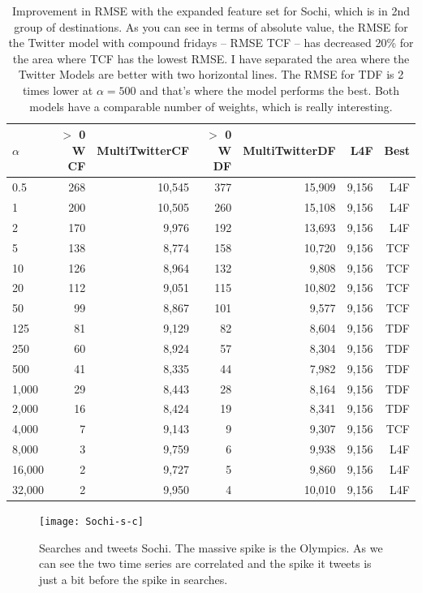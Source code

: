 \documentclass[minf,twoside,singlespacing,parskip,frontabs,notimes,11pt]{infthesis}
\begin{document}
\begin{table}[]
\begin{center}
\begin{tabular}{ l | r | r | r | r | r | r}
$\alpha$ & $>$ 0 W CF & MultiTwitterCF & $>$ 0 W DF & MultiTwitterDF & L4F & Best\\
\hline
0.5 & 268 & 10,545 & 377 & 15,909 & 9,156 & L4F\\
1 & 200 & 10,505 & 260 & 15,108 & 9,156 & L4F\\
2 & 170 & 9,976 & 192 & 13,693 & 9,156 & L4F\\
\hline
5 & 138 & 8,774 & 158 & 10,720 & 9,156 & TCF\\
10 & 126 & 8,964 & 132 & 9,808 & 9,156 & TCF\\
20 & 112 & 9,051 & 115 & 10,802 & 9,156 & TCF\\
50 & 99 & 8,867 & 101 & 9,577 & 9,156 & TCF\\
125 & 81 & 9,129 & 82 & 8,604 & 9,156 & TDF\\
250 & 60 & 8,924 & 57 & 8,304 & 9,156 & TDF\\
500 & 41 & 8,335 & 44 & 7,982 & 9,156 & TDF\\
1,000 & 29 & 8,443 & 28 & 8,164 & 9,156 & TDF\\
2,000 & 16 & 8,424 & 19 & 8,341 & 9,156 & TDF\\
4,000 & 7 & 9,143 & 9 & 9,307 & 9,156 & TCF\\
\hline
8,000 & 3 & 9,759 & 6 & 9,938 & 9,156 & L4F\\
16,000 & 2 & 9,727 & 5 & 9,860 & 9,156 & L4F\\
32,000 & 2 & 9,950 & 4 & 10,010 & 9,156 & L4F\\
\end{tabular}
\end{center}
\caption{Improvement in RMSE with the expanded feature set for Sochi, which is in 2nd group of destinations.  
As you can see in terms of absolute value, the RMSE for the Twitter model with compound fridays -- RMSE TCF -- has decreased 20\% for the area where TCF has the lowest RMSE. I have separated the area where the Twitter Models are better with two horizontal lines. The RMSE for TDF is 2 times lower at $\alpha=500$ and that's where the model performs the best. Both models have a comparable number of weights, which is really interesting.}
\label{table-sochi}
\end{table}



\begin{figure}[]
\begin{center}
\texttt{[image: Sochi-s-c]}
\end{center}
\caption{Searches and tweets Sochi. The massive spike is the Olympics. As we can see the two time series are correlated and the spike it tweets is just a bit before the spike in searches.}
\label{sochi-c-s}
\end{figure}
\end{document}
